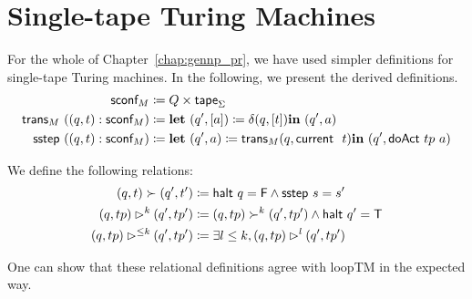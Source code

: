 \section{Single-tape Turing Machines}
For the whole of Chapter~\ref{chap:gennp_pr}, we have used simpler definitions for single-tape Turing machines. 
In the following, we present the derived definitions. 
\begin{align*}
  \textsf{sconf}_M &\coloneqq Q \times \textsf{tape}_\Sigma \\
  \textsf{trans}_M~((q, t) : \textsf{sconf}_M) &\coloneqq \textbf{let}~ (q', [a]) \coloneqq \delta (q, [t]) \textbf{in}~ (q', a) \\
  \textsf{sstep}~((q, t) : \textsf{sconf}_M) &\coloneqq \textbf{let}~ (q', a) \coloneqq \textsf{trans}_M (q, \textsf{current}~~t) \textbf{in}~ (q', \textsf{doAct}~tp~a) 
\end{align*}

We define the following relations: 
\begin{align*}
  (q, t) \succ (q', t') &\coloneqq \textsf{halt}~q = \mathsf{F} \land \textsf{sstep}~s = s' \\
  (q, tp) \rhd^{k} (q', tp') &\coloneqq (q, tp) \succ^k (q', tp') \land \textsf{halt}~q' = \mathsf{T}\\
  (q, tp) \rhd^{\le k} (q', tp') &\coloneqq \exists l \le k, (q, tp) \rhd^l (q', tp')
\end{align*}

One can show that these relational definitions agree with \textsf{loopTM} in the expected way. 

